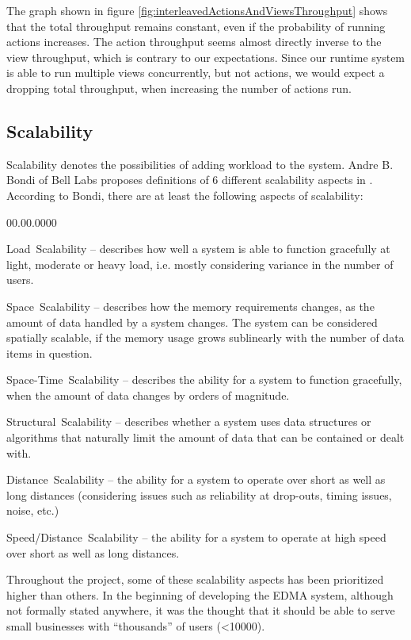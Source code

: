 The graph shown in figure \ref{fig:interleavedActionsAndViewsThroughput}
shows that the total throughput remains constant, even if the probability
of running actions increases. The action throughput seems almost directly
inverse to the view throughput, which is contrary to our expectations.
Since our runtime system is able to run multiple views concurrently,
but not actions, we would expect a dropping total throughput, when
increasing the number of actions run.


\subsection{Scalability}

Scalability denotes the possibilities of adding workload to the system.
Andre B. Bondi of Bell Labs proposes definitions of 6 different scalability
aspects in \cite{bondi2000characteristics}. According to Bondi, there
are at least the following aspects of scalability:
\begin{lyxlist}{00.00.0000}
\item [{Load~Scalability}] -- describes how well a system is able to function
gracefully at light, moderate or heavy load, i.e. mostly considering
variance in the number of users.
\item [{Space~Scalability}] -- describes how the memory requirements changes,
as the amount of data handled by a system changes. The system can
be considered spatially scalable, if the memory usage grows sublinearly
with the number of data items in question.
\item [{Space-Time~Scalability}] -- describes the ability for a system
to function gracefully, when the amount of data changes by orders
of magnitude.
\item [{Structural~Scalability}] -- describes whether a system uses data
structures or algorithms that naturally limit the amount of data that
can be contained or dealt with.
\item [{Distance~Scalability}] -- the ability for a system to operate
over short as well as long distances (considering issues such as reliability
at drop-outs, timing issues, noise, etc.)
\item [{Speed/Distance~Scalability}] -- the ability for a system to operate
at high speed over short as well as long distances.
\end{lyxlist}
Throughout the project, some of these scalability aspects has been
prioritized higher than others. In the beginning of developing the
EDMA system, although not formally stated anywhere, it was the thought
that it should be able to serve small businesses with ``thousands''
of users (<10000). 


